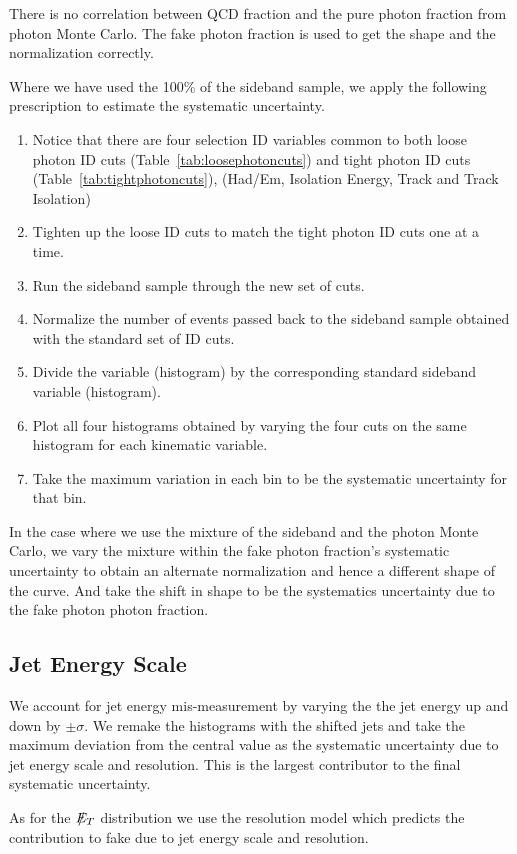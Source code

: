 \documentclass[11pt]{article}
\begin{document}
There is no correlation between QCD fraction and the pure photon fraction from photon Monte Carlo. The fake photon fraction is used to get the shape and the normalization correctly.

Where we have used the 100\% of the sideband sample, we apply the following prescription to estimate the systematic uncertainty.

\begin{enumerate}
\item Notice that there are four selection ID variables common to both loose photon ID cuts (Table~\ref{tab:loosephotoncuts})  and tight photon ID cuts (Table~\ref{tab:tightphotoncuts}), (Had/Em, Isolation Energy, Track \pt and Track Isolation)
\item Tighten up the loose ID cuts to match the tight photon ID cuts one at a time.
\item Run the sideband sample through the new set of cuts.
\item Normalize the number of events passed back to the sideband sample obtained with the standard set of ID cuts.
\item Divide the variable (histogram) by the corresponding standard sideband variable (histogram).
\item Plot all four histograms obtained by varying the four cuts  on the same histogram for each kinematic variable.
\item Take the maximum variation in each bin to be the systematic uncertainty for that bin.
\end{enumerate}

In the case where we use the mixture of the sideband and the photon Monte Carlo, we vary the mixture within the fake photon fraction's systematic uncertainty to obtain an alternate normalization and hence a different shape of the curve. And take the shift in shape to be the systematics uncertainty due to the fake photon photon fraction.

\subsection{Jet Energy Scale}
We account for jet energy mis-measurement by varying the the jet energy up and down by $\pm \sigma$. We remake the histograms with the shifted jets and take the maximum deviation from the central value as the systematic uncertainty due to jet energy scale and resolution. This is the largest contributor to the final systematic uncertainty.

As for the $\met$ distribution we use the \met resolution model which predicts the contribution to fake \met due to jet energy scale and resolution.
\end{document}
